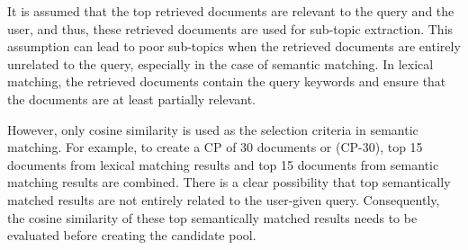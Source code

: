 
It is assumed that the top retrieved documents are relevant to the query and the user, and thus, these retrieved documents are used for sub-topic extraction. This assumption can lead to poor sub-topics when the retrieved documents are entirely unrelated to the query, especially in the case of semantic matching. In lexical matching, the retrieved documents contain the query keywords and ensure that the documents are at least partially relevant.

 However, only cosine similarity is used as the selection criteria in semantic matching. For example, to create a \ac{CP} of 30 documents or (\ac{CP}-30), top 15 documents from lexical matching results and top 15 documents from semantic matching results are combined. There is a clear possibility that top semantically matched results are not entirely related to the user-given query. Consequently, the cosine similarity of these top semantically matched results needs to be evaluated before creating the candidate pool.

